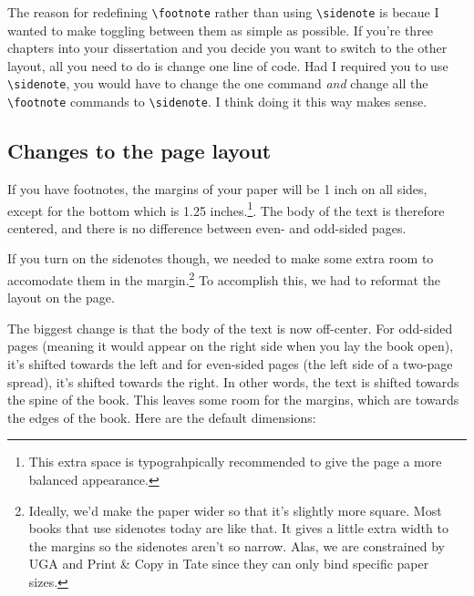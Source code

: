 \documentclass[./dissertation.tex]{subfiles}
\begin{document}
    The reason for redefining \verb+\footnote+ rather than using \verb+\sidenote+ is becaue I wanted to make toggling between them as simple as possible. If you're three chapters into your dissertation and you decide you want to switch to the other layout, all you need to do is change one line of code. Had I required you to use \verb+\sidenote+, you would have to change the one command \textit{and} change all the \verb+\footnote+ commands to \verb+\sidenote+. I think doing it this way makes sense.

    \subsection{Changes to the page layout}

    If you have footnotes, the margins of your paper will be 1 inch on all sides, except for the bottom which is 1.25 inches.\footnote{This extra space is typo\-grahpically recommended to give the page a more balanced appearance.}. The body of the text is therefore centered, and there is no difference between even- and odd-sided pages.

    If you turn on the sidenotes though, we needed to make some extra room to accomodate them in the margin.\footnote{Ideally, we'd make the paper wider so that it's slightly more square. Most books that use sidenotes today are like that. It gives a little extra width to the margins so the sidenotes aren't so narrow. Alas, we are constrained by UGA and Print \& Copy in Tate since they can only bind specific paper sizes.} To accomplish this, we had to reformat the layout on the page.

    The biggest change is that the body of the text is now off-center. For odd-sided pages (meaning it would appear on the right side when you lay the book open), it's shifted towards the left and for even-sided pages (the left side of a two-page spread), it's shifted towards the right. In other words, the text is shifted towards the spine of the book. This leaves some room for the margins, which are towards the edges of the book. Here are the default dimensions:
\end{document}
